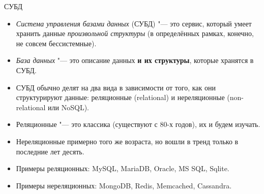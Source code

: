 \begin{frame}[t]{СУБД}
	\begin{itemize}
		\item \textit{Система управления базами данных} (СУБД) "--- это сервис, который умеет хранить данные \textit{произвольной структуры}
			(в определённых рамках, конечно, не совсем бессистемные).
		\item \textit{База данных} "--- это описание данных \textbf{и их структуры}, которые хранятся в СУБД.
		\item СУБД обычно делят на два вида в зависимости от того, как они структурируют данные: реляционные (relational) и нереляционные (non-relational или NoSQL).
		\item Реляционные "--- это классика (существуют с 80-х годов), их и будем изучать.
		\item Нереляционные примерно того же возраста, но вошли в тренд только в последние лет десять.
		\item Примеры реляционных: MySQL, MariaDB, Oracle, MS SQL, Sqlite.
		\item Примеры нереляционных: MongoDB, Redis, Memcached, Cassandra.
	\end{itemize}
\end{frame}

